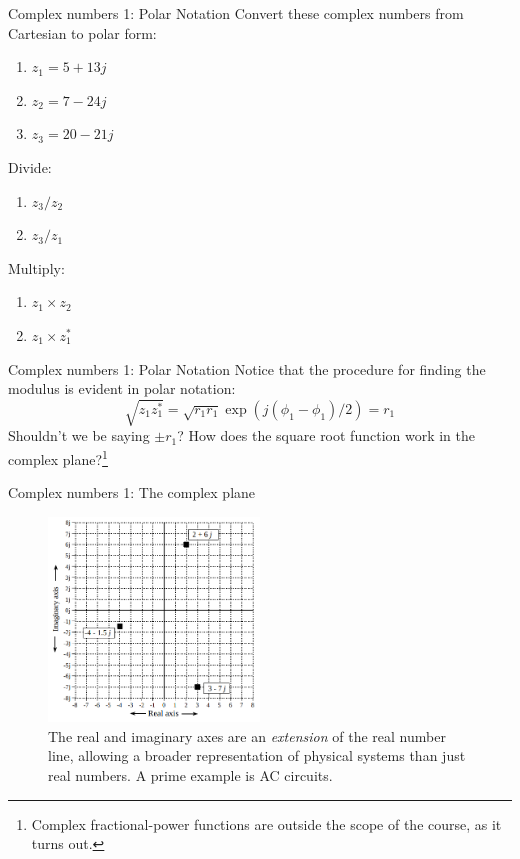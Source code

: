 \documentclass{beamer}
\begin{document}
\begin{frame}{Complex numbers 1: Polar Notation}
\small
Convert these complex numbers from Cartesian to polar form:
\begin{enumerate}
\item $z_1 = 5+13j$
\item $z_2 = 7-24j$
\item $z_3 = 20-21j$
\end{enumerate}
Divide:
\begin{enumerate}
\item $z_3/z_2$
\item $z_3/z_1$
\end{enumerate}
Multiply:
\begin{enumerate}
\item $z_1 \times z_2$
\item $z_1 \times z_1^*$
\end{enumerate}
\end{frame}

\begin{frame}{Complex numbers 1: Polar Notation}
Notice that the procedure for finding the modulus is evident in polar notation:
\begin{equation}
\sqrt{z_1 z_1^*} = \sqrt{r_1 r_1} \exp(j(\phi_1 - \phi_1)/2) = r_1
\end{equation}
Shouldn't we be saying $\pm r_1$?  How does the square root function work in the complex plane?\footnote{Complex fractional-power functions are outside the scope of the course, as it turns out.}
\end{frame}

\begin{frame}{Complex numbers 1: The complex plane}
\begin{figure}
\centering
\includegraphics[width=0.5\textwidth]{figures/plane1.png}
\caption{\label{fig:complex4} The real and imaginary axes are an \textit{extension} of the real number line, allowing a broader representation of physical systems than just real numbers.  A prime example is AC circuits.}
\end{figure}
\end{frame}
\end{document}
